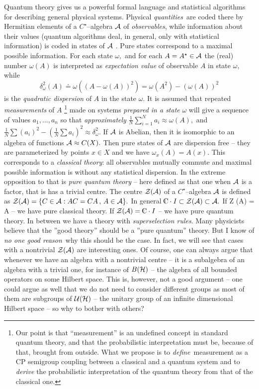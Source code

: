 \documentclass[12pt]{article}
\def\complex{{\kern .1em {\raise .47ex \hbox
{$\scriptscriptstyle
|$}}
\kern -.4em {\rm C}}}
\begin{document}
Quantum theory gives us a powerful formal language and
statistical algorithms for
describing general physical systems.
Physical {\em quantities}\ are coded there by
Hermitian elements of a $C^{\star }$--algebra ${\cal A}$ of {\em observables}, 
while information about their values  (quantum algorithms deal,  in general, 
only with statistical information)  is coded in states of 
${\cal A}$ .  Pure states correspond to a maximal possible information.  For
each state $\omega , $ and for each $A=A^{\star }\in {\cal A}$ the  (real)
number
$\omega
 (A)$ is interpreted as {\em expectation value} of observable $A$ in state $
\omega , $ while 
$$
\delta _\omega ^2 (A)\doteq \omega  ( (A-\omega  (A))^2)=\omega 
 (A^2)- (\omega  (A))^2 
$$
is the {\em quadratic dispersion} of $A$ in the state $\omega . $ It is assumed
that repeated {\em measurements} of $A$
\footnote{Our point is that ``measurement'' is an undefined concept in
standard quantum theory, and that the probabilistic interpretation
must be, because of that, brought from outside. What we propose
is to {\em define}\, measurement as a CP semigroup coupling between a
classical and a quantum system and to {\em derive} the probabilistic
interpretation of the quantum theory from that of the classical one.}
made on systems 
{\em prepared in a state} $
\omega $ will give a sequence of values $a_1, \ldots , a_n$ so that 
{\em approximately} ${\frac
1N}\sum_{i=1}^Na_i\approx \omega  (A), $ and ${\frac 1N}\sum  (a_i)^2- ({\frac 1N
}\sum a_i)^2\approx \delta _\omega ^2. $ If ${\cal A}$ is Abelian,  then it is
isomorphic to an algebra of functions ${\cal A}\approx C (X). $ Then pure
states of ${\cal A}$ are dispersion free -- they are parameterized by points $
x\in X$ and we have $\omega _x (A)=A (x). $ This corresponds to a {\em classical
theory}:  all observables mutually commute and maximal possible information
is without any statistical dispersion.  In the extreme opposition to that is
{\em pure quantum theory} -- here defined as that one 
when ${\cal A}$ is a factor, that is has a trivial centre.  The centre
${\cal Z (A)}$ of a $C^\star$--algebra ${\cal A}$ is defined as
${\cal Z (A)}=\{C\in {\cal A}
: AC=CA\, , \, A\in {\cal A}\}. $ In general $\complex \cdot I\subset {\cal Z (A)}
\subset 
{\cal A}. $ If {\cal Z (A) = A} -- we have pure classical theory.  If ${\cal 
Z (A)}=\complex \cdot I$ -- we have pure quantum theory.  In between we have 
a theory
with {\em superselection rules}.  Many physicists believe that the ''good
theory'' should be a ''pure quantum'' theory.  But I know of {\em no one good
 reason}\
why this should be the case.  In fact,  we will see that cases with a
nontrivial ${\cal Z (A)}$ are interesting ones.  Of course,  one can always
argue that whenever we have an algebra with a nontrivial centre -- it is a
subalgebra of an algebra with a trivial one,  for instance of $B ({\cal H})$
-- the algebra of all bounded operators on some Hilbert space.  This is,
however, not a good argument -- one could argue as well that we do not need
to consider different groups as most of them are subgroups of ${\cal U (H)}$
-- the unitary group of an infinite dimensional Hilbert space -- so why
to bother with others?
\end{document}
